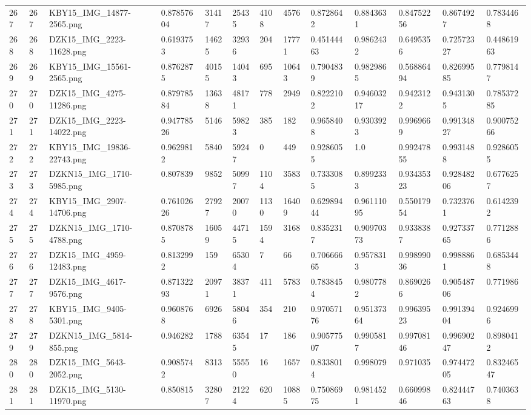 \documentclass[11pt, a4paper, twoside]{report}
\begin{document}
\begin{longtable}[c]{@{}lllllllllllll@{}}
267 & 267 & KBY15\_IMG\_14877-2565.png & 0.87857604 & 31417 & 25435 & 4108 & 4576 & 0.8728642 & 0.8843631 & 0.84752256 & 0.8674927 & 0.7834468 \\
268 & 268 & DZK15\_IMG\_2223-11628.png & 0.6193753 & 14625 & 32936 & 204 & 17771 & 0.45144463 & 0.9862432 & 0.6495356 & 0.72572327 & 0.44861963 \\
269 & 269 & KBY15\_IMG\_15561-2565.png & 0.8762875 & 40155 & 14043 & 695 & 10643 & 0.7904839 & 0.9829865 & 0.56886494 & 0.82699585 & 0.7798147 \\
270 & 270 & DZK15\_IMG\_4275-11286.png & 0.87978584 & 13638 & 48171 & 778 & 2949 & 0.8222102 & 0.94603217 & 0.9423122 & 0.9431305 & 0.78537285 \\
271 & 271 & DZK15\_IMG\_2223-14022.png & 0.94778526 & 5146 & 59823 & 385 & 182 & 0.9658408 & 0.9303923 & 0.9969669 & 0.99134827 & 0.90075266 \\
272 & 272 & KBY15\_IMG\_19836-22743.png & 0.9629812 & 5840 & 59247 & 0 & 449 & 0.9286055 & 1.0 & 0.99247855 & 0.9931488 & 0.9286055 \\
273 & 273 & DZKN15\_IMG\_1710-5985.png & 0.807839 & 9852 & 50997 & 1104 & 3583 & 0.7333085 & 0.8992333 & 0.93435323 & 0.92848206 & 0.6776257 \\
274 & 274 & KBY15\_IMG\_2907-14706.png & 0.76102626 & 27927 & 20070 & 1130 & 16409 & 0.62989444 & 0.96111095 & 0.55017954 & 0.7323761 & 0.6142392 \\
275 & 275 & DZKN15\_IMG\_1710-4788.png & 0.8708785 & 16059 & 44715 & 1594 & 3168 & 0.8352317 & 0.90970373 & 0.9338387 & 0.92733765 & 0.7712886 \\
276 & 276 & DZK15\_IMG\_4959-12483.png & 0.8132992 & 159 & 65304 & 7 & 66 & 0.70666665 & 0.9578313 & 0.99899036 & 0.9988861 & 0.6853448 \\
277 & 277 & DZK15\_IMG\_4617-9576.png & 0.87132293 & 20971 & 38371 & 411 & 5783 & 0.7838454 & 0.9807782 & 0.8690266 & 0.90548706 & 0.771986 \\
278 & 278 & KBY15\_IMG\_9405-5301.png & 0.9608768 & 6926 & 58046 & 354 & 210 & 0.97057176 & 0.95137364 & 0.99639523 & 0.99139404 & 0.9246996 \\
279 & 279 & DZKN15\_IMG\_5814-855.png & 0.946282 & 1788 & 63545 & 17 & 186 & 0.90577507 & 0.9905817 & 0.99708146 & 0.99690247 & 0.8980412 \\
280 & 280 & DZK15\_IMG\_5643-2052.png & 0.9085742 & 8313 & 55550 & 16 & 1657 & 0.8338014 & 0.998079 & 0.971035 & 0.97447205 & 0.83246547 \\
281 & 281 & DZK15\_IMG\_5130-11970.png & 0.850815 & 32807 & 21224 & 620 & 10885 & 0.75086975 & 0.9814521 & 0.66099846 & 0.82444763 & 0.7403638 \\

\end{longtable}
\end{document}
